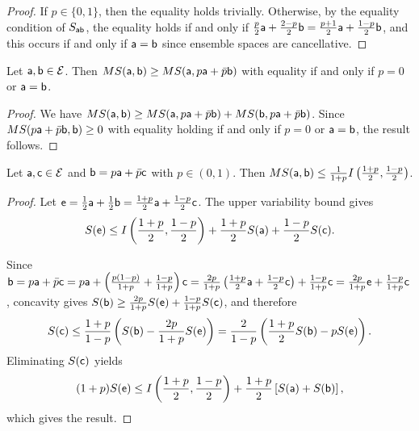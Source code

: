 \begin{mathSection}
\begin{proof}
	If $p \in \{0,1\}$, then the equality holds trivially. Otherwise, by the equality condition of $S_{\ens[a]\ens[b]}$, the equality holds if and only if $\frac{p}{2}\ens[a] + \frac{2-p}{2}\ens[b] = \frac{p+1}{2}\ens[a] + \frac{1-p}{2}\ens[b]$, and this occurs if and only if $\ens[a]=\ens[b]$ since ensemble spaces are cancellative.
\end{proof}

\begin{coro}\label{pm-es-mixingEntropyMonotonic}
	Let $\ens[a],\ens[b] \in \Ens$. Then $MS(\ens[a],\ens[b]) \ge MS(\ens[a],p\ens[a]+\bar{p}\ens[b])$ with equality if and only if $p=0$ or $\ens[a]=\ens[b]$.
\end{coro}

\begin{proof}
	We have $MS(\ens[a],\ens[b]) \ge MS(\ens[a],p\ens[a]+\bar{p}\ens[b]) + MS(\ens[b],p\ens[a]+\bar{p}\ens[b])$. Since $MS(p\ens[a]+\bar{p}\ens[b],\ens[b]) \ge 0$ with equality holding if and only if $p=0$ or $\ens[a]=\ens[b]$, the result follows.
\end{proof}

\begin{prop}\label{pm-es-mixingEntropyUniformBound}
	Let $\ens[a], \ens[c] \in \Ens$ and $\ens[b] = p\ens[a] + \bar{p}\ens[c]$ with $p \in (0,1)$. Then $MS(\ens[a],\ens[b]) \leq \frac{1}{1+p}I\left(\frac{1+p}{2},\frac{1-p}{2}\right)$.
\end{prop}

\begin{proof}
	Let $\ens = \frac{1}{2}\ens[a] + \frac{1}{2}\ens[b] = \frac{1+p}{2}\ens[a] + \frac{1-p}{2}\ens[c]$. The upper variability bound gives
	\begin{equation}
		S(\ens) \leq I\left(\frac{1+p}{2},\frac{1-p}{2}\right) + \frac{1+p}{2}S(\ens[a]) + \frac{1-p}{2}S(\ens[c]).
	\end{equation}
	
	Since $\ens[b] = p\ens[a] + \bar{p}\ens[c] = p\ens[a] + \left(\frac{p(1-p)}{1+p} + \frac{1-p}{1+p}\right)\ens[c] = \frac{2p}{1+p}\left(\frac{1+p}{2}\ens[a] + \frac{1-p}{2}\ens[c]\right) + \frac{1-p}{1+p}\ens[c] = \frac{2p}{1+p}\ens + \frac{1-p}{1+p}\ens[c]$, concavity gives $S(\ens[b]) \geq \frac{2p}{1+p}S(\ens) + \frac{1-p}{1+p}S(\ens[c])$, and therefore
	\begin{equation}
		S(\ens[c]) \leq \frac{1+p}{1-p} \left( S(\ens[b]) - \frac{2p}{1+p}S(\ens) \right) = \frac{2}{1-p} \left( \frac{1+p}{2} S(\ens[b]) - pS(\ens) \right).
	\end{equation}
	Eliminating $S(\ens[c])$ yields
	\begin{equation}
		(1+p)S(\ens) \leq I\left(\frac{1+p}{2},\frac{1-p}{2}\right) + \frac{1+p}{2}\left[S(\ens[a])+S(\ens[b])\right],
	\end{equation}
	which gives the result.
\end{proof}

\end{mathSection}

